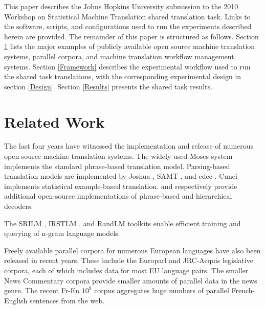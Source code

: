 \documentclass[11pt]{article}
\begin{document}
This paper describes the Johns Hopkins University submission to the 2010 Workshop on Statistical Machine Translation shared translation task. Links to the software, scripts, and configurations used to run the experiments described herein are provided. The remainder of this paper is structured as follows. Section \ref{Related Work} lists the major examples of publicly available open source machine translation systems, parallel corpora, and machine translation workflow management systems. Section \ref{Framework} describes the experimental workflow used to run the shared task translations, with the corresponding experimental design in section \ref{Design}. Section \ref{Results} presents the shared task results.






\begin{figure*}[htbp]

\caption{Machine translation workflow. Nodes in grey indicate software and scripts. The scripts and configuration files used to implement and run this workflow are available for download at \url{http://sourceforge.net/projects/joshua/files/joshua/1.3/wmt2010-experiment.tgz}}
\label{dependencyGraph}
\end{figure*}


\section{Related Work}
\label{Related Work}

The last four years have witnessed the implementation and release of numerous open source machine translation systems. The widely used Moses system \cite{moses} implements the standard phrase-based translation model. Parsing-based translation models are implemented by Joshua \cite{Joshua-WMT}, SAMT \cite{samt2006}, and cdec \cite{cdec}. Cunei \cite{Phillips2009} implements statistical example-based translation.  and  respectively provide additional open-source implementations of phrase-based and hierarchical decoders.

The SRILM \cite{Stolcke2002}, IRSTLM \cite{IRSTLM}, and RandLM \cite{Talbot2007a} toolkits enable efficient training and querying of n-gram language models. 

Freely available parallel corpora for numerous European languages have also been released in recent years. These include the Europarl \cite{Koehn-europarl} and JRC-Acquis \cite{Steinberger-2006} legislative corpora, each of which includes data for most EU language pairs. The smaller News Commentary corpora \cite{Callison-Burch2007a,Callison-Burch2008a} provide smaller amounts of parallel data in the news genre. The recent Fr-En $10^9$ \cite{WMT09-Findings} corpus aggregates huge numbers of parallel French-English sentences from the web.
\end{document}
